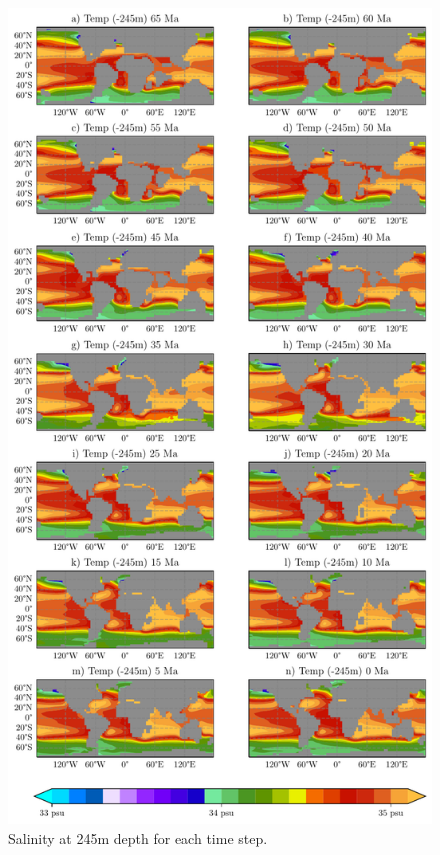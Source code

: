 \documentclass[a4paper]{article}
\begin{document}
\begin{figure}[ht]
		\centering
	\includegraphics[width=0.7\linewidth]{full_sss.pdf}
	\caption{Salinity at 245m depth for each time step.}
	\label{fig:sss_total}
\end{figure}
\end{document}
